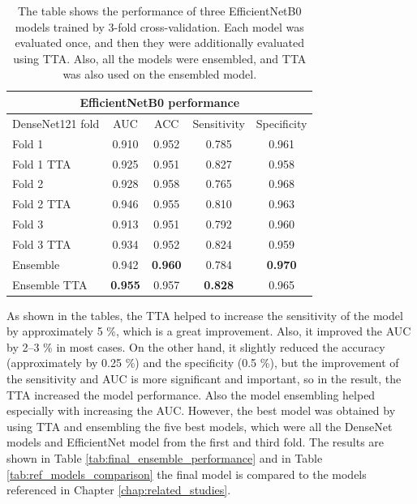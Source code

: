 \documentclass[thesis=B,english]{FITthesis}[2019/12/23]
\begin{document}
\begin{table}[h]
    \centering
        \begin{tabular}{ |p{3cm}||c|c|c|c|  }
         \hline
         \multicolumn{5}{|c|}{EfficientNetB0 performance} \\
         \hline
         \hline
         DenseNet121 fold & AUC & ACC & Sensitivity & Specificity\\
         \hline
         Fold 1       & 0.910 & 0.952 & 0.785 & 0.961\\
         Fold 1 TTA   & 0.925 & 0.951 & 0.827 & 0.958\\
         Fold 2       & 0.928 & 0.958 & 0.765 & 0.968\\
         Fold 2 TTA   & 0.946 & 0.955 & 0.810 & 0.963\\
         Fold 3       & 0.913 & 0.951 & 0.792 & 0.960\\
         Fold 3 TTA   & 0.934 & 0.952 & 0.824 & 0.959\\
         Ensemble     & 0.942 & \textbf{0.960} & 0.784 & \textbf{0.970}\\
         Ensemble TTA & \textbf{0.955} & 0.957 & \textbf{0.828} & 0.965\\
         \hline
        \end{tabular}
    \caption{The table shows the performance of three EfficientNetB0 models trained by 3-fold cross-validation. Each model was evaluated once, and then they were additionally evaluated using TTA. Also, all the models were ensembled, and TTA was also used on the ensembled model.}
    \label{tab:EfficientNet_performance}
\end{table}

As shown in the tables, the TTA helped to increase the sensitivity of the model by approximately 5 \%, which is a great improvement. Also, it improved the AUC by 2--3 \% in most cases. On the other hand, it slightly reduced the accuracy (approximately by 0.25 \%) and the specificity (0.5 \%), but the improvement of the sensitivity and AUC is more significant and important, so in the result, the TTA increased the model performance. Also the model ensembling helped especially with increasing the AUC. However, the best model was obtained by using TTA and ensembling the five best models, which were all the DenseNet models and EfficientNet model from the first and third fold. The results are shown in Table  \ref{tab:final_ensemble_performance} and in Table \ref{tab:ref_models_comparison} the final model is compared to the models referenced in Chapter \ref{chap:related_studies}.
\end{document}
